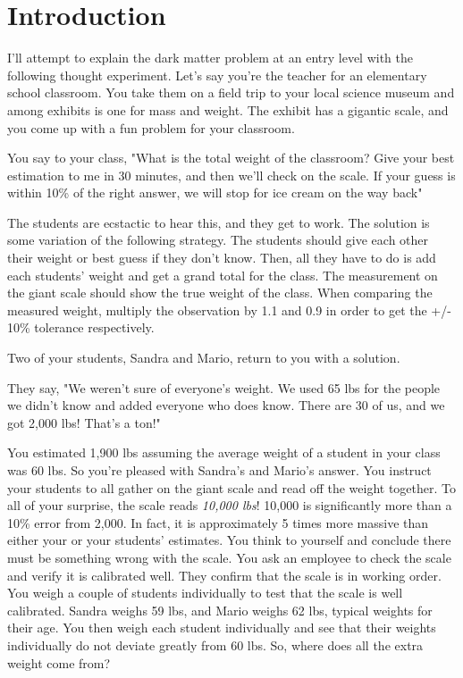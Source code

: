 \section{Introduction\label{sec:intro2dm}}

I'll attempt to explain the dark matter problem at an entry level with the following thought experiment.
Let's say you're the teacher for an elementary school classroom.
You take them on a field trip to your local science museum and among exhibits is one for mass and weight.
The exhibit has a gigantic scale, and you come up with a fun problem for your classroom.

You say to your class, "What is the total weight of the classroom?
Give your best estimation to me in 30 minutes, and then we'll check on the scale.
If your guess is within 10\% of the right answer, we will stop for ice cream on the way back"

The students are ecstactic to hear this, and they get to work.
The solution is some variation of the following strategy.
The students should give each other their weight or best guess if they don't know.
Then, all they have to do is add each students' weight and get a grand total for the class.
The measurement on the giant scale should show the true weight of the class.
When comparing the measured weight, multiply the observation by 1.1 and 0.9 in order to get the +/- 10\% tolerance respectively.

Two of your students, Sandra and Mario, return to you with a solution.

They say, "We weren't sure of everyone's weight.
We used 65 lbs for the people we didn't know and added everyone who does know.
There are 30 of us, and we got 2,000 lbs!
That's a ton!"

You estimated 1,900 lbs assuming the average weight of a student in your class was 60 lbs.
So you're pleased with Sandra's and Mario's answer.
You instruct your students to all gather on the giant scale and read off the weight together.
To all of your surprise, the scale reads \textit{10,000 lbs}!
10,000 is significantly more than a 10\% error from 2,000.
In fact, it is approximately 5 times more massive than either your or your students' estimates.
You think to yourself and conclude there must be something wrong with the scale.
You ask an employee to check the scale and verify it is calibrated well.
They confirm that the scale is in working order.
You weigh a couple of students individually to test that the scale is well calibrated.
Sandra weighs 59 lbs, and Mario weighs 62 lbs, typical weights for their age.
You then weigh each student individually and see that their weights individually do not deviate greatly from 60 lbs.
So, where does all the extra weight come from?

